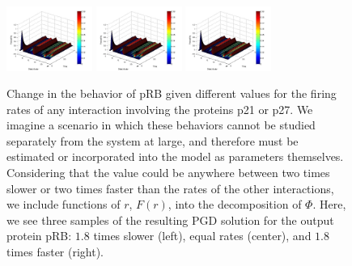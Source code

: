 \documentclass{article}
\begin{document}
\begin{figure}[h!]
\centering
 \includegraphics[width=0.25\textwidth]{pgd_normal.jpg}
  \includegraphics[width=0.25\textwidth]{pgd_normal.jpg}
 \includegraphics[width=0.25\textwidth]{pgd_normal.jpg}
 \caption{Change in the behavior of pRB given different values for the firing rates of any interaction involving the proteins p21 or p27. We imagine a scenario in which these behaviors cannot be studied separately from the system at large, and therefore must be estimated or incorporated into the model as parameters themselves. Considering that the value could be anywhere between two times slower or two times faster than the rates of the other interactions, we include functions of $r$, $F(r)$, into the decomposition of $\Phi$. Here, we see three samples of the resulting PGD solution for the output protein pRB: $1.8$ times slower (left), equal rates (center), and $1.8$ times faster (right).}
  \label{compare_par}

\end{figure} 
\end{document}

